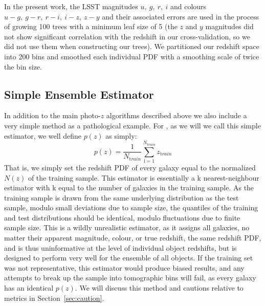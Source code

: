 In the present work, the LSST magnitudes $u,~g,~r,~i$ and colours $u-g,~g-r,~r-i,~i-z,~z-y$ and their associated errors are used in the process of growing 100 trees with a minimum leaf size of 5 (the $z$ and $y$ magnitudes did not show significant correlation with the redshift in our cross-validation, so we did not use them when constructing our trees).
We partitioned our redshift space into 200 bins and smoothed each individual PDF with a smoothing scale of twice the bin size.

\subsection{Simple Ensemble Estimator}\label{sec:method:trainz}

In addition to the main photo-$z$ algorithms described above we also include a very simple method as a pathological example.
For \trainz, as we will we call this simple estimator, we well define $p(z)$ as simply:
\begin{equation}
p(z) = \frac{1}{N_{ \mathrm train}}\sum_{\mathrm i=1}^{N_{\mathrm train}}z_{\mathrm train}
\end{equation}
That is, we simply set the redshift PDF of every galaxy equal to the normalized $N(z)$ of the training sample.
This estimator is essentially a k nearest-neighbour estimator with k equal to the number of galaxies in the training sample.
As the training sample is drawn from the same underlying distribution as the test sample, modulo small deviations due to sample size, the quantiles of the training and test distributions should be identical, modulo fluctuations due to finite sample size.
This is a wildly unrealistic estimator, as it assigns all galaxies, no matter their apparent magnitude, colour, or true redshift, the same redshift PDF, and is thus uninformative at the level of individual object redshifts, but is designed to perform very well for the ensemble of all objects.
If the training set was not representative, this estimator would produce biased results, and any attempts to break up the sample into tomographic bins will fail, as every galaxy has an identical $p(z)$.
We will discuss this method and cautions relative to metrics in Section~\ref{sec:caution}.
